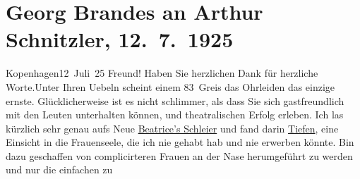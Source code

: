 

         
         \renewcommand{\erwaehntePersonen}{Personen:  ?? [Schuldirektor von Georg Brandes], Georg Brandes}
         \renewcommand{\erwaehnteOrte}{Orte: Kopenhagen, Wien}
         \renewcommand{\erwaehnteWerke}{Werke: Der Schleier der Beatrice. Schauspiel in fünf Akten}
               \section[Georg Brandes an Arthur Schnitzler, 12. 7. 1925]{ Georg Brandes an Arthur Schnitzler, 12. 7. 1925}\nopagebreak{}\rehead{ }\begin{ledgroupsized}[t]{13cm}\normalsize\beginnumbering \toendnotes[C]{\smallbreak\pagebreak[2]} 
\toendnotes[C]{\smallbreak}\pstart
           \raggedleft{}{\pb}Kopenhagen12 Juli 25\pend
           \pstart
           Freund! Haben Sie herzlichen Dank für herzliche Worte.\hspace*{2em}Unter Ihren Uebeln scheint einem 83 Greis das Ohrleiden
               das einzige ernste. Glücklicherweise ist es nicht schlimmer, als dass Sie sich
               gastfreundlich mit den Leuten unterhalten können, und theatralischen Erfolg erleben.
               Ich las kürzlich sehr genau aufs Neue \uline{Beatrice’s Schleier} und fand darin \uline{Tiefen}, eine Einsicht in die
               Frauenseele, die ich nie gehabt hab und nie erwerben könnte. Bin dazu geschaffen von
               complicirteren Frauen an der Nase herumgeführt zu werden und nur die einfachen zu

\end{ledgroupsized}
